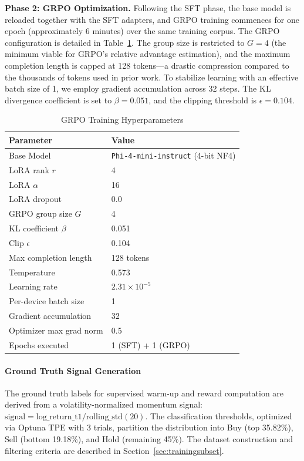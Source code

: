     \textbf{Phase 2: GRPO Optimization.} Following the SFT phase, the base model is reloaded together with the SFT adapters, and GRPO training commences for one epoch (approximately 6 minutes) over the same training corpus. The GRPO configuration is detailed in Table~\ref{tab:grpo_config}. The group size is restricted to $G=4$ (the minimum viable for GRPO's relative advantage estimation), and the maximum completion length is capped at 128 tokens---a drastic compression compared to the thousands of tokens used in prior work. To stabilize learning with an effective batch size of 1, we employ gradient accumulation across 32 steps. The KL divergence coefficient is set to $\beta=0.051$, and the clipping threshold is $\epsilon=0.104$.

    \begin{table}[htbp]
    \centering
    \caption{GRPO Training Hyperparameters}
    \label{tab:grpo_config}
    \begin{tabular}{ll}
    \hline
    \textbf{Parameter} & \textbf{Value} \\
    \hline
    Base Model & \texttt{Phi-4-mini-instruct} (4-bit NF4) \\
    LoRA rank $r$ & 4 \\
    LoRA $\alpha$ & 16 \\
    LoRA dropout & 0.0 \\
    GRPO group size $G$ & 4 \\
    KL coefficient $\beta$ & 0.051 \\
    Clip $\epsilon$ & 0.104 \\
    Max completion length & 128 tokens \\
    Temperature & 0.573 \\
    Learning rate & $2.31\times10^{-5}$ \\
    Per-device batch size & 1 \\
    Gradient accumulation & 32 \\
    Optimizer max grad norm & 0.5 \\
    Epochs executed & 1 (SFT) + 1 (GRPO) \\
    \hline
    \end{tabular}
    \end{table}

    \paragraph{Ground Truth Signal Generation}

    The ground truth labels for supervised warm-up and reward computation are derived from a volatility-normalized momentum signal: $\text{signal} = \text{log\_return\_t1} / \text{rolling\_std}(20)$. The classification thresholds, optimized via Optuna TPE with 3 trials, partition the distribution into Buy (top 35.82\%), Sell (bottom 19.18\%), and Hold (remaining 45\%). The dataset construction and filtering criteria are described in Section~\ref{sec:trainingsubset}.

